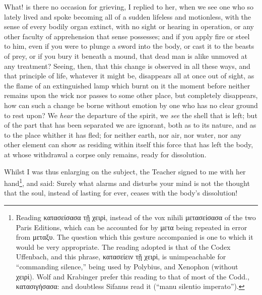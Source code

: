 What! is there no occasion for grieving, I replied to her, when we see one who so lately lived and spoke becoming all of a sudden lifeless and motionless, with the sense of every bodily organ extinct, with no sight or hearing in operation, or any other faculty of apprehension that sense possesses; and if you apply fire or steel to him, even if you were to plunge a sword into the body, or cast it to the beasts of prey, or if you bury it beneath a mound, that dead man is alike unmoved at any treatment? Seeing, then, that this change is observed in all these ways, and that principle of life, whatever it might be, disappears all at once out of sight, as the flame of an extinguished lamp which burnt on it the moment before neither remains upon the wick nor passes to some other place, but completely disappears, how can such a change be borne without emotion by one who has no clear ground to rest upon? We \emph{hear} the departure of the spirit, we \emph{see} the shell that is left; but of the part that has been separated we are ignorant, both as to its nature, and as to the place whither it has fled; for neither earth, nor air, nor water, nor any other element can show as residing within itself this force that has left the body, at whose withdrawal a corpse only remains, ready for dissolution.

Whilst I was thus enlarging on the subject, the Teacher signed to me with her hand\footnote{Reading \textgreek{κατασείσασα τῇ χειρὶ}, instead of the vox nihili \textgreek{μετασείσασα} of the two Paris Editions, which can be accounted for by \textgreek{μετα} being repeated in error from \textgreek{μεταξυ}. The question which this gesture accompanied is one to which it would be very appropriate. The reading adopted is that of the Codex Uffenbach, and this phrase, \textgreek{κατασείειν τῇ χειρὶ}, is unimpeachable for “commanding silence,” being used by Polybius, and Xenophon (without \textgreek{χειρὶ}). Wolf and Krabinger prefer this reading to that of most of the Codd., \textgreek{κατασιγήσασα}: and doubtless Sifanus read it (“manu silentio imperato”).}, and said: Surely what alarms and disturbs your mind is not the thought that the soul, instead of lasting for ever, ceases with the body’s dissolution!

